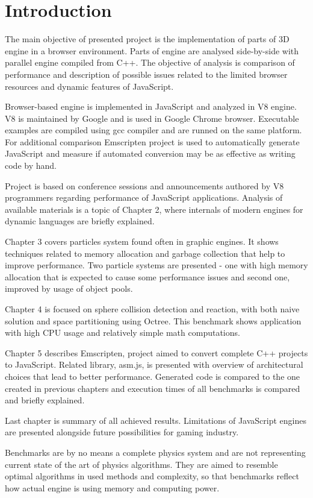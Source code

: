 \chapter{Introduction}
\label{cha:introduction}

The main objective of presented project is the implementation of parts of 3D engine in a browser environment. Parts of engine are analysed side-by-side with parallel engine compiled from C++. The objective of analysis is comparison of performance and description of possible issues related to the limited browser resources and dynamic features of JavaScript.

Browser-based engine is implemented in JavaScript and analyzed in V8 engine. V8 is maintained by Google and is used in Google Chrome browser. Executable examples are compiled using gcc compiler and are runned on the same platform. For additional comparison Emscripten project is used to automatically generate JavaScript and measure if automated conversion may be as effective as writing code by hand.

Project is based on conference sessions and announcements authored by V8 programmers regarding performance of JavaScript applications. Analysis of available materials is a topic of Chapter 2, where internals of modern engines for dynamic languages are briefly explained.

Chapter 3 covers particles system found often in graphic engines. It shows techniques related to memory allocation and garbage collection that help to improve performance. Two particle systems are presented - one with high memory allocation that is expected to cause some performance issues and second one, improved by usage of object pools.

Chapter 4 is focused on sphere collision detection and reaction, with both naive solution and space partitioning using Octree. This benchmark shows application with high CPU usage and relatively simple math computations.

Chapter 5 describes Emscripten, project aimed to convert complete C++ projects to JavaScript. Related library, asm.js, is presented with overview of architectural choices that lead to better performance. Generated code is compared to the one created in previous chapters and execution times of all benchmarks is compared and briefly explained.

Last chapter is summary of all achieved results. Limitations of JavaScript engines are presented alongside future possibilities for gaming industry. 

Benchmarks are by no means a complete physics system and are not representing current state of the art of physics algorithms. They are aimed to resemble optimal algorithms in used methods and complexity, so that benchmarks reflect how actual engine is using memory and computing power.

